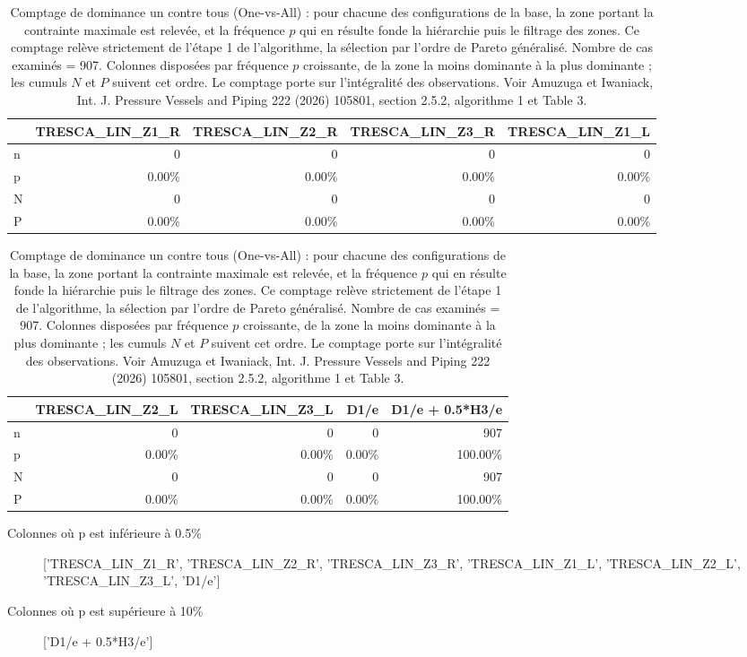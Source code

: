 \documentclass{article}
\begin{document}
    \begin{table}[htbp!]
\centering
\caption{\centering \small Comptage de dominance un contre tous (One-vs-All) : pour chacune des configurations de la base, la zone portant la contrainte maximale est relevée, et la fréquence $p$ qui en résulte fonde la hiérarchie puis le filtrage des zones. Ce comptage relève strictement de l'étape 1 de l'algorithme, la sélection par l'ordre de Pareto généralisé. Nombre de cas examinés = 907. Colonnes disposées par fréquence $p$ croissante, de la zone la moins dominante à la plus dominante ; les cumuls $N$ et $P$ suivent cet ordre. Le comptage porte sur l'intégralité des observations. Voir Amuzuga et Iwaniack, Int. J. Pressure Vessels and Piping 222 (2026) 105801, section 2.5.2, algorithme 1 et Table 3. }
\label{tab:result}
\begingroup\scriptsize
\setlength{\tabcolsep}{2pt}
\begin{tabular}{lrrrr}
\toprule
 & TRESCA_LIN_Z1_R & TRESCA_LIN_Z2_R & TRESCA_LIN_Z3_R & TRESCA_LIN_Z1_L \\
\midrule
n & 0 & 0 & 0 & 0 \\
p & 0.00\% & 0.00\% & 0.00\% & 0.00\% \\
N & 0 & 0 & 0 & 0 \\
P & 0.00\% & 0.00\% & 0.00\% & 0.00\% \\
\bottomrule
\end{tabular}
\vspace{0.35cm}

\begin{tabular}{lrrrr}
\toprule
 & TRESCA_LIN_Z2_L & TRESCA_LIN_Z3_L & D1/e & D1/e + 0.5*H3/e \\
\midrule
n & 0 & 0 & 0 & 907 \\
p & 0.00\% & 0.00\% & 0.00\% & 100.00\% \\
N & 0 & 0 & 0 & 907 \\
P & 0.00\% & 0.00\% & 0.00\% & 100.00\% \\
\bottomrule
\end{tabular}
\endgroup
\end{table}

    \vspace*{0.5cm}
\begin{sloppypar}
\begin{description}
\item[Colonnes où p est inférieure à 0.5\%] ['TRESCA_LIN_Z1_R', 'TRESCA_LIN_Z2_R', 'TRESCA_LIN_Z3_R', 'TRESCA_LIN_Z1_L', 'TRESCA_LIN_Z2_L', 'TRESCA_LIN_Z3_L', 'D1/e']
\item[Colonnes où p est supérieure à 10\%] ['D1/e + 0.5*H3/e']
\end{description}
\end{sloppypar}
\vspace*{0.5cm}

    
\end{document}
